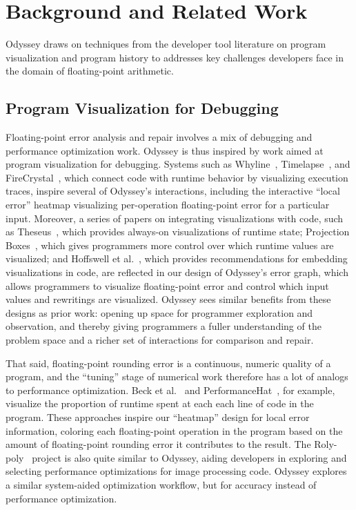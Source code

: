 \section{Background and Related Work}
Odyssey draws on techniques from the developer tool literature on program visualization and program history
  to addresses key challenges developers face
  in the domain of floating-point arithmetic.

\subsection{Program Visualization for Debugging}

Floating-point error analysis and repair
  involves a mix of debugging and performance optimization work.
Odyssey is thus inspired by work aimed at
  program visualization for debugging.
Systems such as Whyline~\cite{ko2004designing}, Timelapse~\cite{burg2013interactive}, and FireCrystal~\cite{oney2009firecrystal},
  which connect code with runtime behavior by visualizing execution traces,
  inspire several of Odyssey's interactions,
  including the interactive ``local error'' heatmap 
  visualizing per-operation floating-point error for a particular input.
Moreover,
  a series of papers on integrating visualizations with code,
  such as Theseus~\cite{lieber2014theseus}, 
  which provides always-on visualizations of runtime state;
  Projection Boxes~\cite{lerner2020projectionBoxes}, 
  which gives programmers more control
  over which runtime values are visualized;
  and Hoffswell et al.~\cite{hoffswell2018augmentingCodeWithInSituVis}, 
  which provides recommendations
  for embedding visualizations in code,
  are reflected in our design of Odyssey's error graph,
  which allows programmers to visualize floating-point error
  and control which input values and rewritings
  are visualized.
Odyssey sees similar benefits from these designs as prior work:
  opening up space for programmer exploration and observation,
  and thereby giving programmers a fuller understanding of the problem space
  and a richer set of interactions for comparison and repair.

That said, floating-point rounding error
  is a continuous, numeric quality of a program,
  and the ``tuning'' stage of numerical work therefore has
  a lot of analogs to performance optimization.
Beck et al.~\cite{beck2013perfBottlenecksVis} and PerformanceHat~\cite{cito2018performanceHat}, for example,
  visualize the proportion of runtime
  spent at each each line of code in the program. 
  These approaches inspire our ``heatmap'' design for local error information,
  coloring each floating-point operation in the program
  based on the amount of floating-point rounding error
  it contributes to the result.
The Roly-poly~\cite{ikarashi2021guidedOptimization} project is also quite similar to Odyssey,
  aiding developers in exploring and selecting performance optimizations
  for image processing code.
Odyssey explores a similar system-aided optimization workflow,
  but for accuracy instead of performance optimization.


